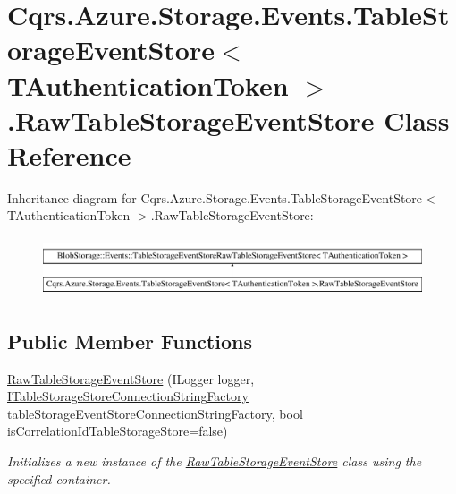 \hypertarget{classCqrs_1_1Azure_1_1Storage_1_1Events_1_1TableStorageEventStore_1_1RawTableStorageEventStore}{}\section{Cqrs.\+Azure.\+Storage.\+Events.\+Table\+Storage\+Event\+Store$<$ T\+Authentication\+Token $>$.Raw\+Table\+Storage\+Event\+Store Class Reference}
\label{classCqrs_1_1Azure_1_1Storage_1_1Events_1_1TableStorageEventStore_1_1RawTableStorageEventStore}
Inheritance diagram for Cqrs.\+Azure.\+Storage.\+Events.\+Table\+Storage\+Event\+Store$<$ T\+Authentication\+Token $>$.Raw\+Table\+Storage\+Event\+Store\+:\begin{figure}[H]
\begin{center}
\leavevmode
\includegraphics[height=1.792000cm]{classCqrs_1_1Azure_1_1Storage_1_1Events_1_1TableStorageEventStore_1_1RawTableStorageEventStore}
\end{center}
\end{figure}
\subsection*{Public Member Functions}
\begin{DoxyCompactItemize}
\item 
\hyperlink{classCqrs_1_1Azure_1_1Storage_1_1Events_1_1TableStorageEventStore_1_1RawTableStorageEventStore_ad82ce92dd98e683b11b2bdc0b8d5bebc}{Raw\+Table\+Storage\+Event\+Store} (I\+Logger logger, \hyperlink{interfaceCqrs_1_1Azure_1_1BlobStorage_1_1ITableStorageStoreConnectionStringFactory}{I\+Table\+Storage\+Store\+Connection\+String\+Factory} table\+Storage\+Event\+Store\+Connection\+String\+Factory, bool is\+Correlation\+Id\+Table\+Storage\+Store=false)
\begin{DoxyCompactList}\small\item\em Initializes a new instance of the \hyperlink{classCqrs_1_1Azure_1_1Storage_1_1Events_1_1TableStorageEventStore_1_1RawTableStorageEventStore}{Raw\+Table\+Storage\+Event\+Store} class using the specified container. \end{DoxyCompactList}\end{DoxyCompactItemize}
